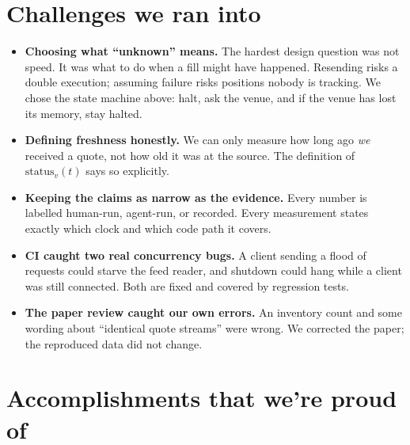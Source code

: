\documentclass[11pt]{article}
\theoremstyle{remark}
\begin{document}
\section*{Challenges we ran into}

\begin{itemize}[leftmargin=1.5em, itemsep=2pt]
  \item \textbf{Choosing what ``unknown'' means.} The hardest design question was not speed.
        It was what to do when a fill might have happened. Resending risks a double execution;
        assuming failure risks positions nobody is tracking. We chose the state machine above:
        halt, ask the venue, and if the venue has lost its memory, stay halted.
  \item \textbf{Defining freshness honestly.} We can only measure how long ago \emph{we}
        received a quote, not how old it was at the source. The definition of
        $\mathrm{status}_v(t)$ says so explicitly.
  \item \textbf{Keeping the claims as narrow as the evidence.} Every number is labelled
        human-run, agent-run, or recorded. Every measurement states exactly which clock and
        which code path it covers.
  \item \textbf{CI caught two real concurrency bugs.} A client sending a flood of requests could
        starve the feed reader, and shutdown could hang while a client was still connected.
        Both are fixed and covered by regression tests.
  \item \textbf{The paper review caught our own errors.} An inventory count and some wording
        about ``identical quote streams'' were wrong. We corrected the paper; the reproduced
        data did not change.
\end{itemize}

\section*{Accomplishments that we're proud of}
\end{document}
